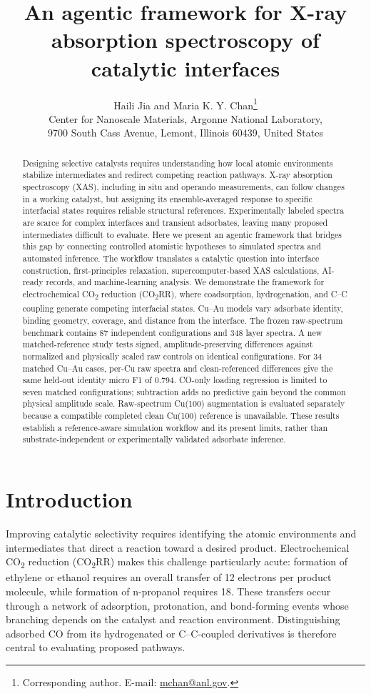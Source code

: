\documentclass[11pt,a4paper]{article}
\title{An agentic framework for X-ray absorption spectroscopy of catalytic interfaces}
\author{Haili Jia and Maria K. Y. Chan\thanks{Corresponding author. E-mail: \href{mailto:mchan@anl.gov}{mchan@anl.gov}.}\\[0.6em]
\small Center for Nanoscale Materials, Argonne National Laboratory,\\
\small 9700 South Cass Avenue, Lemont, Illinois 60439, United States}
\date{}
\begin{document}
\maketitle
\begin{abstract}
Designing selective catalysts requires understanding how local atomic environments stabilize intermediates and redirect competing reaction pathways. X-ray absorption spectroscopy (XAS), including in situ and operando measurements, can follow changes in a working catalyst, but assigning its ensemble-averaged response to specific interfacial states requires reliable structural references. Experimentally labeled spectra are scarce for complex interfaces and transient adsorbates, leaving many proposed intermediates difficult to evaluate. Here we present an agentic framework that bridges this gap by connecting controlled atomistic hypotheses to simulated spectra and automated inference. The workflow translates a catalytic question into interface construction, first-principles relaxation, supercomputer-based XAS calculations, AI-ready records, and machine-learning analysis. We demonstrate the framework for electrochemical CO\textsubscript{2} reduction (CO\textsubscript{2}RR), where coadsorption, hydrogenation, and C--C coupling generate competing interfacial states. Cu--Au models vary adsorbate identity, binding geometry, coverage, and distance from the interface. The frozen raw-spectrum benchmark contains 87 independent configurations and 348 layer spectra. A new matched-reference study tests signed, amplitude-preserving differences against normalized and physically scaled raw controls on identical configurations. For 34 matched Cu--Au cases, per-Cu raw spectra and clean-referenced differences give the same held-out identity micro F1 of 0.794. CO-only loading regression is limited to seven matched configurations; subtraction adds no predictive gain beyond the common physical amplitude scale. Raw-spectrum Cu(100) augmentation is evaluated separately because a compatible completed clean Cu(100) reference is unavailable. These results establish a reference-aware simulation workflow and its present limits, rather than substrate-independent or experimentally validated adsorbate inference.
\end{abstract}

\section{Introduction}
Improving catalytic selectivity requires identifying the atomic environments and intermediates that direct a reaction toward a desired product. Electrochemical CO\textsubscript{2} reduction (CO\textsubscript{2}RR) makes this challenge particularly acute: formation of ethylene or ethanol requires an overall transfer of 12 electrons per product molecule, while formation of n-propanol requires 18.\cite{ni2024,francis2018} These transfers occur through a network of adsorption, protonation, and bond-forming events whose branching depends on the catalyst and reaction environment. Distinguishing adsorbed CO from its hydrogenated or C--C-coupled derivatives is therefore central to evaluating proposed pathways.\cite{zhan2024,montoya2015}
\end{document}
